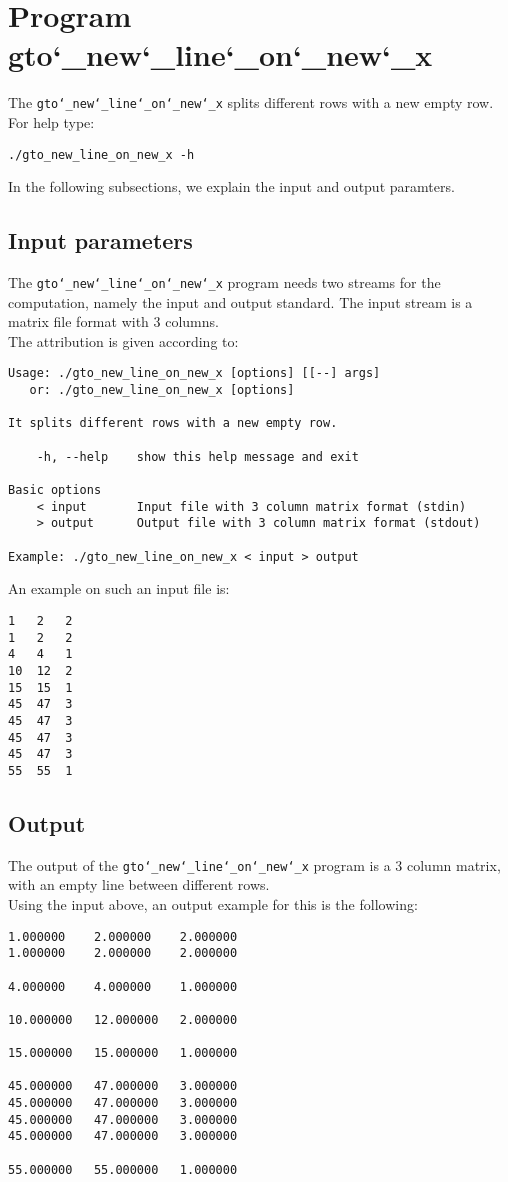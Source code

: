 \section{Program gto\char`_new\char`_line\char`_on\char`_new\char`_x}
The \texttt{gto\char`_new\char`_line\char`_on\char`_new\char`_x} splits different rows with a new empty row.\\
For help type:
\begin{lstlisting}
./gto_new_line_on_new_x -h
\end{lstlisting}
In the following subsections, we explain the input and output paramters.

\subsection*{Input parameters}

The \texttt{gto\char`_new\char`_line\char`_on\char`_new\char`_x} program needs two streams for the computation, namely the input and output standard. The input stream is a matrix file format with 3 columns.\\
The attribution is given according to:
\begin{lstlisting}
Usage: ./gto_new_line_on_new_x [options] [[--] args]
   or: ./gto_new_line_on_new_x [options]

It splits different rows with a new empty row.

    -h, --help    show this help message and exit

Basic options
    < input       Input file with 3 column matrix format (stdin)
    > output      Output file with 3 column matrix format (stdout)

Example: ./gto_new_line_on_new_x < input > output
\end{lstlisting}
An example on such an input file is:
\begin{lstlisting}
1	2	2
1	2	2
4	4	1
10	12	2
15	15	1
45	47	3
45	47	3
45	47	3
45	47	3
55	55	1
\end{lstlisting}

\subsection*{Output}
The output of the \texttt{gto\char`_new\char`_line\char`_on\char`_new\char`_x} program is a 3 column matrix, with an empty line between different rows.\\
Using the input above, an output example for this is the following:
\begin{lstlisting}
1.000000	2.000000	2.000000
1.000000	2.000000	2.000000

4.000000	4.000000	1.000000

10.000000	12.000000	2.000000

15.000000	15.000000	1.000000

45.000000	47.000000	3.000000
45.000000	47.000000	3.000000
45.000000	47.000000	3.000000
45.000000	47.000000	3.000000

55.000000	55.000000	1.000000
\end{lstlisting}
